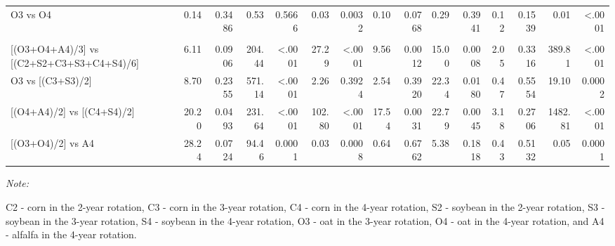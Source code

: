 \documentclass[
]{article}
\begin{document}
\begin{landscape}
\begin{table}
{\begin{threeparttable}
\begin{tabular}[t]{lr>{}r|r>{}r|r>{}r|r>{}r|r>{}r|r>{}r|rr}
\hspace{1em}\hspace{1em}O3 vs O4 & 0.14 & 0.3486 & 0.53 & 0.5666 & 0.03 & 0.0032 & 0.10 & 0.0768 & 0.29 & 0.3941 & 0.12 & 0.1539 & 0.01 & <.0001\\
\addlinespace[0.3em]
\multicolumn{15}{l}{\textbf{(B3) - Crop type effects}}\\
\hspace{1em}\hspace{1em}{}[(O3+O4+A4)/3] vs [(C2+S2+C3+S3+C4+S4)/6] & 6.11 & 0.0906 & 204.44 & <.0001 & 27.29 & <.0001 & 9.56 & 0.0012 & 15.00 & 0.0008 & 2.05 & 0.3316 & 389.81 & <.0001\\
\hspace{1em}\hspace{1em}O3 vs [(C3+S3)/2] & 8.70 & 0.2355 & 571.14 & <.0001 & 2.26 & 0.3924 & 2.54 & 0.3920 & 22.34 & 0.0180 & 0.47 & 0.5554 & 19.10 & 0.0002\\
\hspace{1em}\hspace{1em}{}[(O4+A4)/2] vs [(C4+S4)/2] & 20.20 & 0.0493 & 231.64 & <.0001 & 102.80 & <.0001 & 17.54 & 0.0031 & 22.79 & 0.0045 & 3.18 & 0.2706 & 1482.81 & <.0001\\
\hspace{1em}\hspace{1em}{}[(O3+O4)/2] vs A4 & 28.24 & 0.0724 & 94.46 & 0.0001 & 0.03 & 0.0008 & 0.64 & 0.6762 & 5.38 & 0.1818 & 0.43 & 0.5132 & 0.05 & 0.0001\\
\bottomrule
\end{tabular}
\begin{tablenotes}[para]
\item \textit{Note: } 
\item C2 - corn in the 2-year rotation, C3 - corn in the 3-year rotation, C4 - corn in the 4-year rotation, S2 - soybean in the 2-year rotation, S3 - soybean in the 3-year rotation, S4 - soybean in the 4-year rotation, O3 - oat in the 3-year rotation, O4 - oat in the 4-year rotation, and A4 - alfalfa in the 4-year rotation.
\end{tablenotes}
\end{threeparttable}}
\end{table}
\end{landscape}
\end{document}
